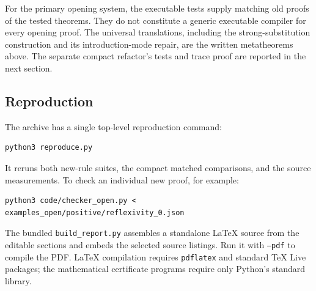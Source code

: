 For the primary opening system, the executable tests supply matching old
proofs of the tested theorems.  They do not constitute a generic executable
compiler for every opening proof.  The universal translations, including
the strong-substitution construction and its introduction-mode repair,
are the written metatheorems above.  The separate compact refactor's tests
and trace proof are reported in the next section.

\subsection{Reproduction}

The archive has a single top-level reproduction command:
\begin{verbatim}
python3 reproduce.py
\end{verbatim}
It reruns both new-rule suites, the compact matched comparisons, and the
source measurements.  To check an individual new proof, for example:
\begin{verbatim}
python3 code/checker_open.py < examples_open/positive/reflexivity_0.json
\end{verbatim}
The bundled \texttt{build\_report.py} assembles a standalone LaTeX source
from the editable sections and embeds the selected source listings.  Run
it with \texttt{--pdf} to compile the PDF.  LaTeX compilation requires
\texttt{pdflatex} and standard TeX Live packages; the mathematical
certificate programs require only Python's standard library.

